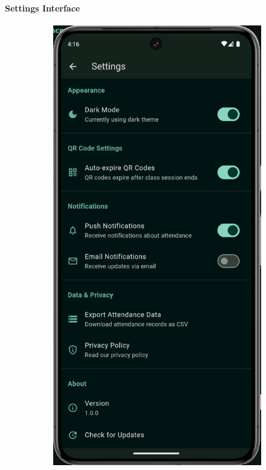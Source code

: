 \paragraph{Settings Interface}
\vspace{1cm}
\begin{figure}[H]
    \centering
    \begin{subfigure}[b]{0.48\textwidth}
        \includegraphics[width=\textwidth]{images/rachid/teacher-side-settings.png}

\end{subfigure}
\end{figure}
